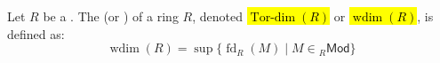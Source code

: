 \begin{definition} \label{definition:tor_dimension_of_a_ring}
    Let $R$ be a .
The  (or ) of a ring $R$, denoted \hl{$\operatorname{Tor-dim}(R)$} or \hl{$\operatorname{wdim}(R)$}, is defined as:
$$\operatorname{wdim}(R) = \sup \{ \operatorname{fd}_R(M) \mid M \in {}_R\mathsf{Mod} \}$$
\end{definition}